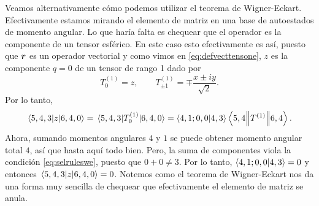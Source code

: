 \documentclass[10pt, a4paper]{article}
\numberwithin{equation}{subsection}
\begin{document}
Veamos alternativamente cómo podemos utilizar el teorema de Wigner-Eckart.
Efectivamente estamos mirando el elemento de matriz en una base de autoestados
de momento angular. Lo que haría falta es chequear que el operador es la
componente de un tensor esférico. En este caso esto efectivamente es así,
puesto que $\vb*{r}$ es un operador vectorial y como vimos en
\eqref{eq:defvecttensone}, $z$ es la componente $q = 0$ de un tensor de rango
1 dado por
\begin{equation} \label{eq:deftensonepos}
  T^{(1)}_0 = z, \qquad T^{(1)}_{\pm1} = \mp\frac{x \pm iy}{\sqrt{2}}.
\end{equation}
Por lo tanto,
\begin{equation}
  \matrixel{5,4,3}{z}{6,4,0} = 
  \matrixel{5,4,3}{T^{(1)}_0}{6,4,0} = \ClebschGordan{4}{1}{0}{0}{4}{3}
  \doublebarmel{5,4}{T^{(1)}}{6,4}.
\end{equation}
Ahora, sumando momentos angulares $4$ y $1$ se puede obtener momento angular
total $4$, así que hasta aquí todo bien. Pero, la suma de componentes viola la
condición \eqref{eq:selruleswe}, puesto que $0 + 0 \neq 3$. Por lo tanto,
$\braket{{4},{1};{0},{0}}{{4},{3}} = 0$ y entonces $\matrixel{5,4,3}{z}{6,4,0} =
0$. Notemos como el teorema de Wigner-Eckart nos da una forma muy sencilla de
chequear que efectivamente el elemento de matriz se anula.

\bigbreak
\end{document}
